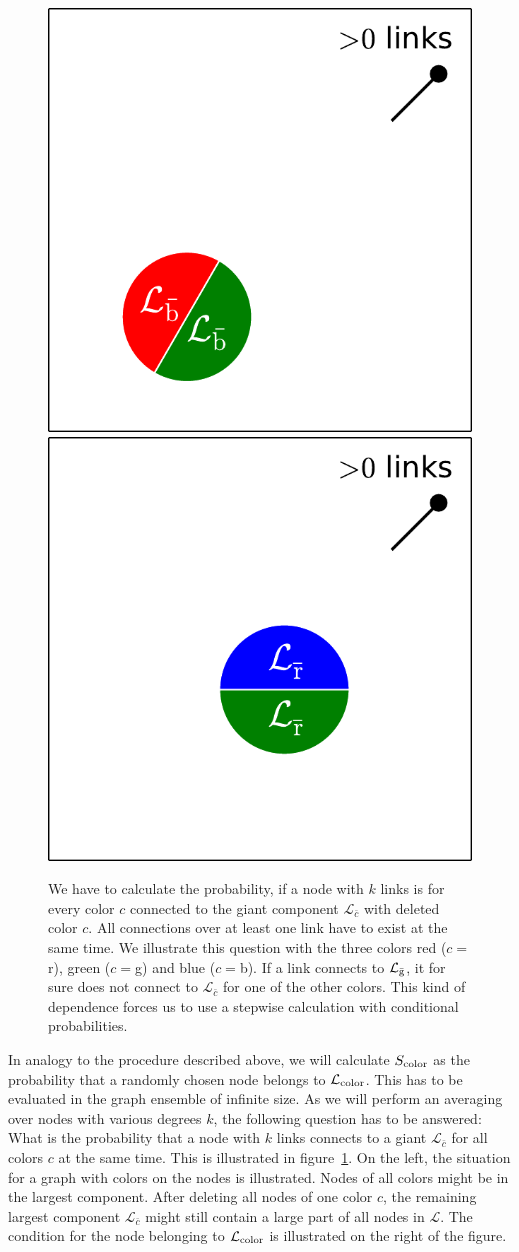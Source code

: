 \documentclass[aps, pre, onecolumn, a4paper, floatfix]{revtex4}
\begin{document}
\begin{figure}[htb]
\begin{minipage}[b]{0.6\linewidth}
\begin{center}
     \hspace{-1mm}
    \includegraphics[trim=100 0 0 0,clip,height=0.4\columnwidth]{sets_k_gc_no_3.pdf}
     \hspace{-1mm}
    \includegraphics[trim=100 0 0 0,clip,height=0.4\columnwidth]{sets_k_gc_no_1.pdf}
   \end{center}
  \end{minipage}
    \caption{We have to calculate the probability, if a node with $k$ links is 
    for every color $c$ connected to the giant component $\mathcal{L}_{\bar c}$ with deleted 
    color $c$. All connections over at least one link have to exist at the same 
    time. We illustrate this question with the three colors red ($c=$r), green 
    ($c=$g) and blue ($c=$b). If a link connects to $\mathcal{L}_{\bar{\rm g}}$, it for 
    sure does not connect to $\mathcal{L}_{\bar c}$ for one of the other colors. This kind of 
    dependence forces us to use a stepwise calculation with conditional probabilities.}
    \label{fig:question}
\end{figure}

In analogy to the procedure described above, 
we will calculate $S_{\rm color}$ as the probability 
that a randomly chosen node belongs to $\mathcal{L}_{\rm color}$. 
This has to be evaluated in the graph ensemble of infinite size. 
As we will perform an averaging over nodes with various degrees $k$, 
the following question has to be answered: 
What is the probability that a node with $k$ links connects 
to a giant $\mathcal{L}_{\bar c}$ for all colors $c$ at the same time. 
This is illustrated in figure~\ref{fig:question}. 
On the left, the situation for a graph with colors on the nodes is illustrated. 
Nodes of all colors might be in the largest component. 
After deleting all nodes of one color $c$, 
the remaining largest component $\mathcal{L}_{\bar c}$ 
might still contain a large part of all nodes in $\mathcal{L}$. 
The condition for the node belonging to $\mathcal{L}_{\rm color}$ 
is illustrated on the right of the figure. 
\end{document}
